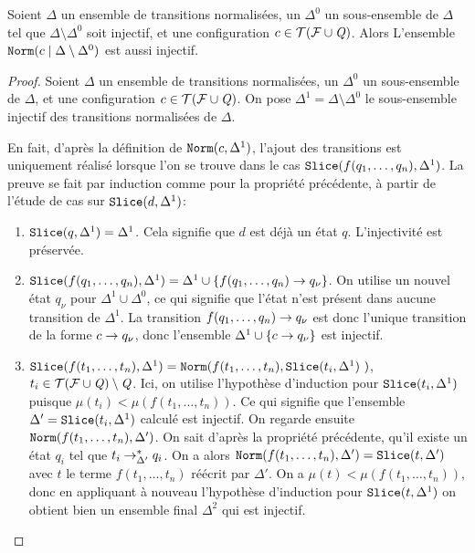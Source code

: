  \begin{property}
   \label{prop:norm_injectivity}
   Soient $\Delta$ un ensemble de transitions normalisées, un $\Delta^0$ un sous-ensemble 
   de $\Delta$ tel que $\Delta \setminus \Delta^0$ soit injectif, et une configuration $c \in \mathcal{ T(F \cup \mathit Q)}$.
   Alors L'ensemble $\mathtt{Norm}(c \; | \; \Delta \setminus \Delta^0)$ est aussi injectif.
 \end{property}

 \begin{proof}
   Soient $\Delta$ un ensemble de transitions normalisées, un $\Delta^0$ un sous-ensemble 
   de $\Delta$, et une configuration $c \in \mathcal{ T(F \cup \mathit Q)}$.
   On pose $\Delta^1 = \Delta \setminus \Delta^0$ le sous-ensemble injectif des transitions normalisées de $\Delta$.
   
   En fait, d'après la définition de $\mathtt{Norm}(c, \Delta^1)$, l'ajout des transitions est 
   uniquement réalisé lorsque l'on se trouve dans le cas $\mathtt{Slice}(f(q_1,\dots,q_n), \Delta^1)$.
   La preuve se fait par induction comme pour la propriété précédente, à partir de l'étude de cas sur $\mathtt{Slice}(d, \Delta^1)$:

   \begin{enumerate}
   \item $\mathtt{Slice}(q, \Delta^1) = \Delta^1$. Cela signifie que $d$ est déjà un état $q$. L'injectivité est préservée.
     
   \item $\mathtt{Slice}(f(q_1, \dots, q_n), \Delta^1) = \Delta^1 \cup \{ f(q_1, \dots, q_n) \rightarrow q_\nu\}$.
     On utilise un nouvel état $q_\nu$ pour $\Delta^1 \cup \Delta^0$, ce qui signifie que l'état n'est présent dans aucune transition
     de $\Delta^1$. La transition $f(q_1, \dots, q_n) \rightarrow q_\nu$ est donc l'unique transition de la forme $c \rightarrow q_\nu$,
     donc l'ensemble $\Delta^1 \cup \{ c \rightarrow q_\nu\}$ est injectif.

   \item $\mathtt{Slice}(f(t_1, \dots, t_n), \Delta^1) = \mathtt{Norm}(f(t_1,\dots, t_n), \mathtt{Slice}(t_i, \Delta^1)\ )$, $t_i \in \mathcal{ T(F \cup \mathit Q)} \setminus \mathit Q$.
     Ici, on utilise l'hypothèse d'induction pour $\mathtt{Slice}(t_i, \Delta^1)$ puisque $\mu (t_i) < \mu(f(t_1, \dots, t_n))$.
     Ce qui signifie que l'ensemble $\Delta' = \mathtt{Slice}(t_i, \Delta^1)$ calculé est injectif.
     On regarde ensuite $\mathtt{Norm}(f(t_1,\dots, t_n), \Delta')$. On sait d'après la propriété précédente, qu'il existe
     un état $q_i$ tel que $t_i \rightarrow^*_{\Delta'} q_i$. On a alors $\mathtt{Norm}(f(t_1,\dots, t_n), \Delta') = \mathtt{Slice}(t, \Delta')$
     avec $t$ le terme $f(t_1,\dots, t_n)$ réécrit par $\Delta'$. On a $\mu (t) < \mu(f(t_1, \dots, t_n))$, donc en
     appliquant à nouveau l'hypothèse d'induction pour $\mathtt{Slice}(t, \Delta^1)$ on obtient bien un ensemble final $\Delta^2$ qui est injectif.
   \end{enumerate}

\end{proof}

